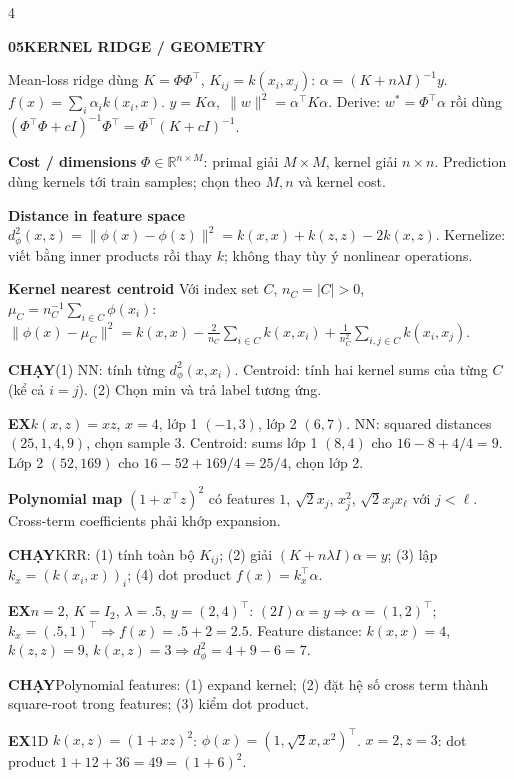 \documentclass[a4paper]{article}
\newcommand{\topic}[2]{\par\addvspace{.8pt}%
  \begingroup\setlength{\fboxsep}{0.5pt}%
  \noindent\colorbox{structure}{\parbox{\dimexpr\linewidth-2\fboxsep\relax}{%
    \color{white}\fontsize{6.5}{7.1}\selectfont\bfseries #1\enspace #2}}%
  \endgroup\par\nobreak\vspace{.3pt}\nobreak}
\newcommand{\run}[1]{\key{CHẠY}#1}
\newcommand{\key}[1]{\par\textcolor{structure}{\textbf{#1}}\enspace}
\newcommand{\note}[4]{\par\begingroup\setlength{\fboxsep}{0.15pt}%
  \noindent\colorbox{#1}{\parbox{\dimexpr\linewidth-2\fboxsep\relax}{%
    \RaggedRight\textcolor{#2}{\textbf{#3}}\enspace #4}}%
  \endgroup\par}
\newcommand{\ex}[1]{\note{examplebg}{example}{EX}{#1}}
\newcommand{\R}{\mathbb{R}}
\newcommand{\norm}[1]{\lVert#1\rVert}
\begin{document}
\begin{multicols*}{4}
\topic{05}{KERNEL RIDGE / GEOMETRY}
Mean-loss ridge dùng $K=\Phi\Phi^\top$, $K_{ij}=k(x_i,x_j)$:
$\alpha=(K+n\lambda I)^{-1}y.$
$f(x)=\sum_i\alpha_i k(x_i,x).$
$\hat y=K\alpha,\;\norm w^2=\alpha^\top K\alpha.$
Derive: $w^*=\Phi^\top\alpha$ rồi dùng
$(\Phi^\top\Phi+cI)^{-1}\Phi^\top=\Phi^\top(K+cI)^{-1}$.
\key{Cost / dimensions}
$\Phi\in\R^{n\times M}$: primal giải $M\times M$, kernel giải $n\times n$. Prediction dùng kernels tới train samples; chọn theo $M,n$ và kernel cost.
\key{Distance in feature space}
$d_\phi^2(x,z)=\norm{\phi(x)-\phi(z)}^2=k(x,x)+k(z,z)-2k(x,z).$
Kernelize: viết bằng inner products rồi thay $k$; không thay tùy ý nonlinear operations.
\key{Kernel nearest centroid}
Với index set $C$, $n_C=|C|>0$, $\mu_C=n_C^{-1}\sum_{i\in C}\phi(x_i)$:
$\norm{\phi(x)-\mu_C}^2=k(x,x)-\tfrac{2}{n_C}\sum_{i\in C}k(x,x_i)+\tfrac{1}{n_C^2}\sum_{i,j\in C}k(x_i,x_j)$.
\run{(1) NN: tính từng $d_\phi^2(x,x_i)$. Centroid: tính hai kernel sums của từng $C$ (kể cả $i=j$). (2) Chọn min và trả label tương ứng.}
\ex{$k(x,z)=xz$, $x=4$, lớp 1 $(-1,3)$, lớp 2 $(6,7)$. NN: squared distances $(25,1,4,9)$, chọn sample $3$. Centroid: sums lớp 1 $(8,4)$ cho $16-8+4/4=9$. Lớp 2 $(52,169)$ cho $16-52+169/4=25/4$, chọn lớp 2.}
\key{Polynomial map}
$(1+x^\top z)^2$ có features $1$, $\sqrt2x_j$, $x_j^2$, $\sqrt2x_jx_\ell$ với $j<\ell$. Cross-term coefficients phải khớp expansion.
\run{KRR: (1) tính toàn bộ $K_{ij}$; (2) giải $(K+n\lambda I)\alpha=y$; (3) lập $k_x=(k(x_i,x))_i$; (4) dot product $f(x)=k_x^\top\alpha$.}
\ex{$n=2$, $K=I_2$, $\lambda=.5$, $y=(2,4)^\top$: $(2I)\alpha=y\Rightarrow\alpha=(1,2)^\top$; $k_x=(.5,1)^\top\Rightarrow f(x)=.5+2=2.5$. Feature distance: $k(x,x)=4$, $k(z,z)=9$, $k(x,z)=3\Rightarrow d_\phi^2=4+9-6=7$.}
\run{Polynomial features: (1) expand kernel; (2) đặt hệ số cross term thành square-root trong features; (3) kiểm dot product.}
\ex{1D $k(x,z)=(1+xz)^2$: $\phi(x)=(1,\sqrt2x,x^2)^\top$. $x=2,z=3$: dot product $1+12+36=49=(1+6)^2$.}


\end{multicols*}
\end{document}
